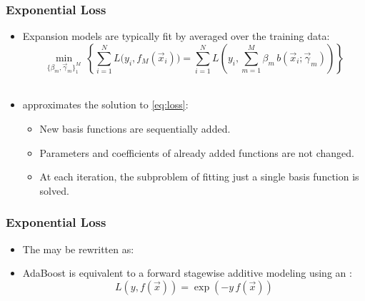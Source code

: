 \begin{frame}
  \frametitle{Exponential Loss \cont}

  \begin{itemize}
    \item Expansion models are typically fit by  averaged over the training data:
      \begin{equation} 
        \label{eq:loss}
        \min_{\{ \beta_m, \vec \gamma_m \}_1^M } ~ 
        \left\{
          \sum_{i=1}^N L \big( y_i, f_M(\vec{x}_i) \big) =
          \sum_{i=1}^N L \left( y_i, \sum_{m=1}^M \beta_m \, b(\vec{x}_i ; \vec \gamma_m) \right)
        \right\}
      \end{equation}
      \\[.3cm] \pause
    \item {} approximates the solution to \eqref{eq:loss}: \\[.1cm]
      \begin{itemize}
        \item New basis functions are sequentially added. \\[.1cm] %
        \item Parameters and coefficients of already added functions are not changed. \\[.1cm] %
        \item At each iteration, the subproblem of fitting just a single basis function is solved.
      \end{itemize}
  \end{itemize}
\end{frame}


\begin{frame}
  \frametitle{Exponential Loss \cont}

  \begin{itemize}
    \item The  may be rewritten as: \\[.3cm]
      \begin{center}
      \end{center}
      \vspace{.3cm} \pause
    \item AdaBoost is equivalent to a forward stagewise additive modeling using an :
      \begin{displaymath}
        L(y, f(\vec x)) = \exp (-y \, f(\vec x))
      \end{displaymath}
  \end{itemize}
\end{frame}


